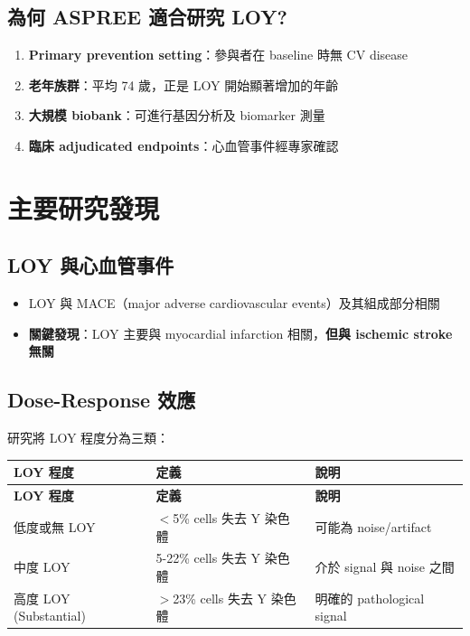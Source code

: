 \documentclass[12pt,a4paper]{article}
\begin{document}
\subsection{為何 ASPREE 適合研究 LOY?}

\begin{enumerate}
    \item \textbf{Primary prevention setting}：參與者在 baseline 時無 CV disease
    \item \textbf{老年族群}：平均 74 歲，正是 LOY 開始顯著增加的年齡
    \item \textbf{大規模 biobank}：可進行基因分析及 biomarker 測量
    \item \textbf{臨床 adjudicated endpoints}：心血管事件經專家確認
\end{enumerate}

\section{主要研究發現}

\subsection{LOY 與心血管事件}

\begin{itemize}
    \item LOY 與 MACE（major adverse cardiovascular events）及其組成部分相關
    \item \textbf{關鍵發現}：LOY 主要與 myocardial infarction 相關，\textbf{但與 ischemic stroke 無關}
\end{itemize}

\subsection{Dose-Response 效應}

研究將 LOY 程度分為三類：
\begin{longtable}{p{4cm}p{5cm}p{5cm}}
\toprule
\textbf{LOY 程度} & \textbf{定義} & \textbf{說明} \\
\midrule
\endfirsthead
\toprule
\textbf{LOY 程度} & \textbf{定義} & \textbf{說明} \\
\midrule
\endhead
低度或無 LOY & $<$5\% cells 失去 Y 染色體 & 可能為 noise/artifact \\
\midrule
中度 LOY & 5-22\% cells 失去 Y 染色體 & 介於 signal 與 noise 之間 \\
\midrule
高度 LOY (Substantial) & $>$23\% cells 失去 Y 染色體 & 明確的 pathological signal \\
\bottomrule
\end{longtable}
\end{document}
